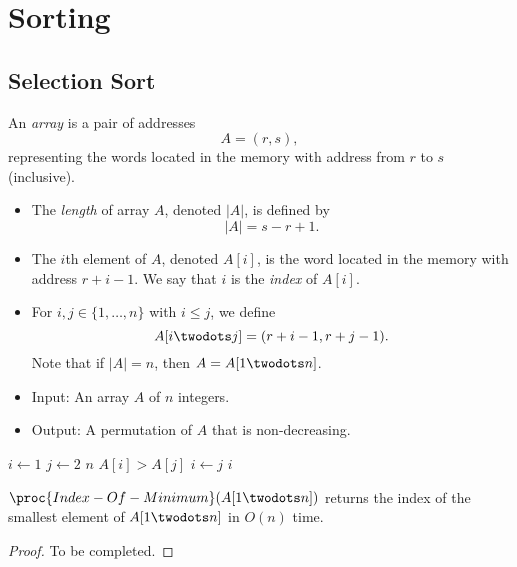 \chapter{Sorting}
\section{Selection Sort}
\begin{definition}
  An \emph{array} is a pair of addresses
  \begin{equation*}
    A = (r, s),
  \end{equation*}
  representing the words located in the memory with address from $r$ to $s$
  (inclusive).
  \begin{itemize}
    \item The \emph{length} of array $A$, denoted $|A|$, is defined by
    \begin{equation*}
      |A| = s - r + 1.
    \end{equation*}
    \item The $i$th element of $A$, denoted $A[i]$, is the word located in the
    memory with address $r + i - 1$.
    We say that $i$ is the \emph{index} of $A[i]$.
    \item For $i, j \in \{1, \dots, n\}$ with $i \leq j$, we define
    \begin{equation*}
      A[i \twodots j] = (r + i - 1, r + j - 1).
    \end{equation*}
    Note that if $|A| = n$, then $A = A[1 \twodots n]$.
  \end{itemize}
\end{definition}

\begin{problem}
  \label{prob:sorting}
  \leavevmode
  \begin{itemize}
    \item Input: An array $A$ of $n$ integers.
    \item Output: A permutation of $A$ that is non-decreasing.
  \end{itemize}
\end{problem}

\begin{codebox}
  \li $i \gets 1$
  \li \For $j \gets 2$ \To $n$ \Do
  \li     \If $A[i] > A[j]$ \Then
  \li         $i \gets j$
          \End
      \End
  \li \Return $i$
\end{codebox}

\begin{theorem}
  $\proc{Index-Of-Minimum}(A[1 \twodots n])$ returns the index of the smallest
  element of $A[1 \twodots n]$ in $O(n)$ time.
\end{theorem}
\begin{proof}
  To be completed.
\end{proof}


